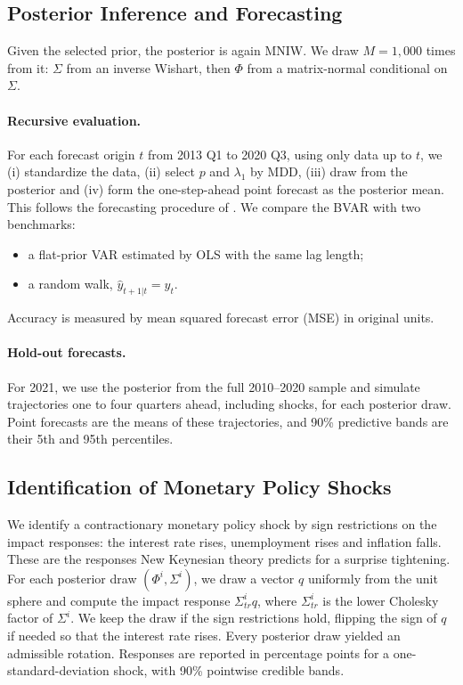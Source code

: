 \documentclass[11pt]{article}
\begin{document}
\subsection{Posterior Inference and Forecasting}

Given the selected prior, the posterior is again MNIW. We draw $M = 1{,}000$ times from it: $\Sigma$ from an inverse Wishart, then $\Phi$ from a matrix-normal conditional on $\Sigma$.

\paragraph{Recursive evaluation.} For each forecast origin $t$ from 2013 Q1 to 2020 Q3, using only data up to $t$, we (i) standardize the data, (ii) select $p$ and $\lambda_1$ by MDD, (iii) draw from the posterior and (iv) form the one-step-ahead point forecast as the posterior mean. This follows the forecasting procedure of \citet{glp2015}. We compare the BVAR with two benchmarks:
\begin{itemize}
  \item a flat-prior VAR estimated by OLS with the same lag length;
  \item a random walk, $\hat y_{t+1|t} = y_t$.
\end{itemize}
Accuracy is measured by mean squared forecast error (MSE) in original units.

\paragraph{Hold-out forecasts.} For 2021, we use the posterior from the full 2010--2020 sample and simulate trajectories one to four quarters ahead, including shocks, for each posterior draw. Point forecasts are the means of these trajectories, and 90\% predictive bands are their 5th and 95th percentiles.

\subsection{Identification of Monetary Policy Shocks}

We identify a contractionary monetary policy shock by sign restrictions on the impact responses: the interest rate rises, unemployment rises and inflation falls. These are the responses New Keynesian theory predicts for a surprise tightening. For each posterior draw $(\Phi^i, \Sigma^i)$, we draw a vector $q$ uniformly from the unit sphere and compute the impact response $\Sigma^i_{tr} q$, where $\Sigma^i_{tr}$ is the lower Cholesky factor of $\Sigma^i$. We keep the draw if the sign restrictions hold, flipping the sign of $q$ if needed so that the interest rate rises. Every posterior draw yielded an admissible rotation. Responses are reported in percentage points for a one-standard-deviation shock, with 90\% pointwise credible bands.
\end{document}
